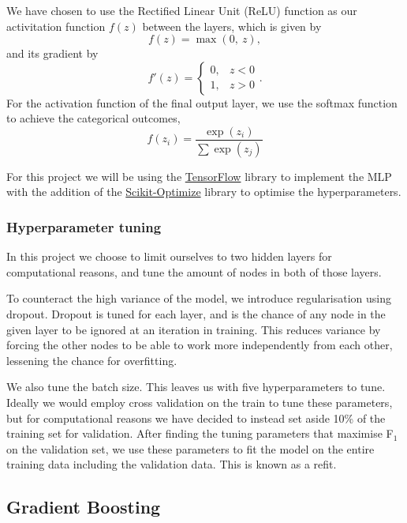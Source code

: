 \documentclass[a4paper, 11pt, twocolumn]{article}
\begin{document}
We have chosen to use the Rectified Linear Unit (ReLU) function as our 
activitation function $f(z)$ between the layers, which is given by 
\begin{equation}
      f(z) = \max (0,\ z),
\end{equation}
and its gradient by 
\begin{equation}
      f'(z) = 
      \begin{cases} 
            0, &  z<0\\
            1, &  z>0
      \end{cases}. 
\end{equation}
For the activation function of the final output layer, we use the softmax 
function to achieve the categorical outcomes,
\begin{equation}
      f(z_i)=\frac{\exp(z_i)}{\sum \exp(z_j)}
\end{equation}

For this project we will be using the \href{https://www.tensorflow.org/}
{TensorFlow} library to implement the MLP with the addition of the 
\href{https://scikit-optimize.github.io/}{Scikit-Optimize} library to optimise 
the hyperparameters.

\subsubsection{Hyperparameter tuning}
In this project we choose to limit ourselves to two hidden layers for computational reasons, and tune 
the amount of nodes in both of those layers. 

To counteract the high variance of the model, we introduce
regularisation using dropout. Dropout is tuned for each
layer, and is the chance of any node in the given layer
to be ignored at an iteration in training. This reduces
variance by forcing the other nodes to be able to work
more independently from each other, lessening the chance
for overfitting.

We also tune the batch size. This leaves us with five 
hyperparameters to tune. Ideally we would employ cross 
validation on the train to tune these parameters, but
for computational reasons we have decided to instead
set aside 10\% of the training set for validation.
After finding the tuning parameters that maximise 
F$_1$ on the validation set, we use these parameters to 
fit the model on the entire training data including the 
validation data. This is known as a refit. 

\subsection{Gradient Boosting}
\end{document}
